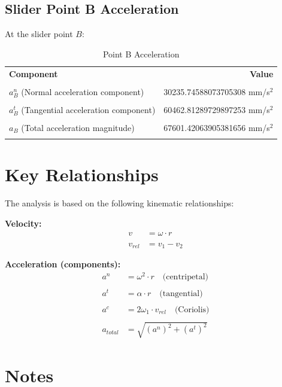 \documentclass[12pt]{article}
\begin{document}
\subsection*{Slider Point B Acceleration}

At the slider point $B$:

\begin{table}[h]
\centering
\begin{tabular}{|l|r|}
\hline
\textbf{Component} & \textbf{Value} \\\\
\hline
$a^n_B$ (Normal acceleration component) & 30235.74588073705308 mm/s$^2$ \\\\
$a^t_B$ (Tangential acceleration component) & 60462.81289729897253 mm/s$^2$ \\\\
$a_B$ (Total acceleration magnitude) & 67601.42063905381656 mm/s$^2$ \\\\
\hline
\end{tabular}
\caption{Point B Acceleration}
\end{table}

\section*{Key Relationships}

The analysis is based on the following kinematic relationships:

\textbf{Velocity:}
\begin{align*}
v &= \omega \cdot r \\\\
v_{rel} &= v_1 - v_2
\end{align*}

\textbf{Acceleration (components):}
\begin{align*}
a^n &= \omega^2 \cdot r \quad \text{(centripetal)} \\\\
a^t &= \alpha \cdot r \quad \text{(tangential)} \\\\
a^c &= 2\omega_1 \cdot v_{rel} \quad \text{(Coriolis)} \\\\
a_{total} &= \sqrt{(a^n)^2 + (a^t)^2}
\end{align*}

\section*{Notes}
\end{document}
